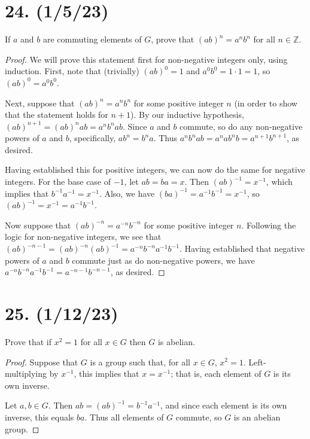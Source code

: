 \documentclass{article}
\begin{document}
\section*{24. (1/5/23)}

If $a$ and $b$ are commuting elements of $G$, prove that $(ab)^n = a^n b^n$ for all $n \in \mathbb{Z}$.

\begin{proof}
      We will prove this statement first for non-negative integers only, using induction. First, note that (trivially) $(ab)^0 = 1$ and $a^0 b^0 = 1 \cdot 1 = 1$, so $(ab)^0 = a^0 b^0$.

      Next, suppose that $(ab)^n = a^n b^n$ for some positive integer $n$ (in order to show that the statement holds for $n + 1$). By our inductive hypothesis, $(ab)^{n + 1} = (ab)^n ab = a^n b^n ab$. Since $a$ and $b$ commute, so do any non-negative powers of $a$ and $b$, specifically, $ab^n = b^n a$. Thus $a^n b^n ab = a^n a b^n b = a^{n + 1} b^{n + 1}$, as desired.

      Having established this for positive integers, we can now do the same for negative integers. For the base case of $-1$, let $ab = ba = x$. Then $(ab)^{-1} = x^{-1}$, which implies that $b^{-1} a^{-1} = x^{-1}$. Also, we have $(ba)^{-1} = a^{-1} b^{-1} = x^{-1}$, so $(ab)^{-1} = x^{-1} = a^{-1} b^{-1}$.

      Now suppose that $(ab)^{-n} = a^{-n} b^{-n}$ for some positive integer $n$. Following the logic for non-negative integers, we see that $(ab)^{-n - 1} = (ab)^{-n} (ab)^{-1} = a^{-n} b^{-n} a^{-1} b^{-1}$. Having established that negative powers of $a$ and $b$ commute just as do non-negative powers, we have $a^{-n} b^{-n} a^{-1} b^{-1} = a^{-n - 1} b^{-n - 1}$, as desired.
\end{proof}

\section*{25. (1/12/23)}

Prove that if $x^2 = 1$ for all $x \in G$ then $G$ is abelian.

\begin{proof}
      Suppose that $G$ is a group such that, for all $x \in G$, $x^2 = 1$. Left-multiplying by $x^{-1}$, this implies that $x = x^{-1}$; that is, each element of $G$ is its own inverse.

      Let $a, b \in G$. Then $ab = (ab)^{-1} = b^{-1} a^{-1}$, and since each element is its own inverse, this equals $ba$. Thus all elements of $G$ commute, so $G$ is an abelian group.
\end{proof}
\end{document}
